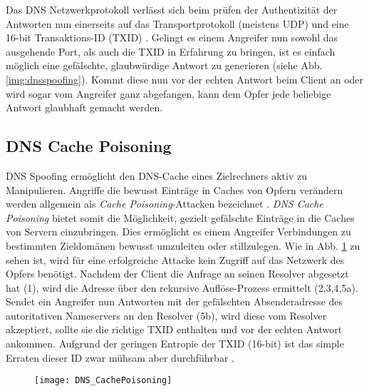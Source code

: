 Das DNS Netzwerkprotokoll verlässt sich beim prüfen der Authentizität der Antworten nun einerseits auf das Transportprotokoll (meistens UDP) und eine 16-bit Transaktions-ID (TXID) \cite{rfc1035}. Gelingt es einem Angreifer nun sowohl das ausgehende Port, als auch die TXID in Erfahrung zu bringen, ist es einfach möglich eine gefälschte, glaubwürdige Antwort zu generieren (siehe Abb. \ref{img:dnsspoofing}). Kommt diese nun vor der echten Antwort beim Client an oder wird sogar vom Angreifer ganz abgefangen, kann dem Opfer jede beliebige Antwort glaubhaft gemacht werden.

\subsection{DNS Cache Poisoning}
DNS Spoofing ermöglicht den DNS-Cache eines Zielrechners aktiv zu Manipulieren. Angriffe die bewusst Einträge in Caches von Opfern verändern werden allgemein als \textit{Cache Poisoning}-Attacken bezeichnet \cite{CAPEC141}. \textit{DNS Cache Poisoning} bietet somit die Möglichkeit, gezielt gefälschte Einträge in die Caches von Servern einzubringen\cite{CAPEC142}. Dies ermöglicht es einem Angreifer Verbindungen zu bestimmten Zieldomänen bewusst umzuleiten oder stillzulegen. Wie in Abb. \ref{img:dnscachepoisoning} zu sehen ist, wird für eine erfolgreiche Attacke kein Zugriff auf das Netzwerk des Opfers benötigt. Nachdem der Client die Anfrage an seinen Resolver abgesetzt hat (1), wird die Adresse über den rekursive Auflöse-Prozess ermittelt (2,3,4,5a). Sendet ein Angreifer nun Antworten mit der gefälschten Absenderadresse des autoritativen Nameservers an den Resolver (5b), wird diese vom Resolver akzeptiert, sollte sie die richtige TXID enthalten und vor der echten Antwort ankommen. Aufgrund der geringen Entropie der TXID (16-bit) ist das simple Erraten dieser ID zwar mühsam aber durchführbar \cite{Son2010}.      

\begin{figure}[htbp]
    \centering
    \texttt{[image: DNS\_CachePoisoning]}
    \caption{}
    \label{img:dnscachepoisoning}
\end{figure}

